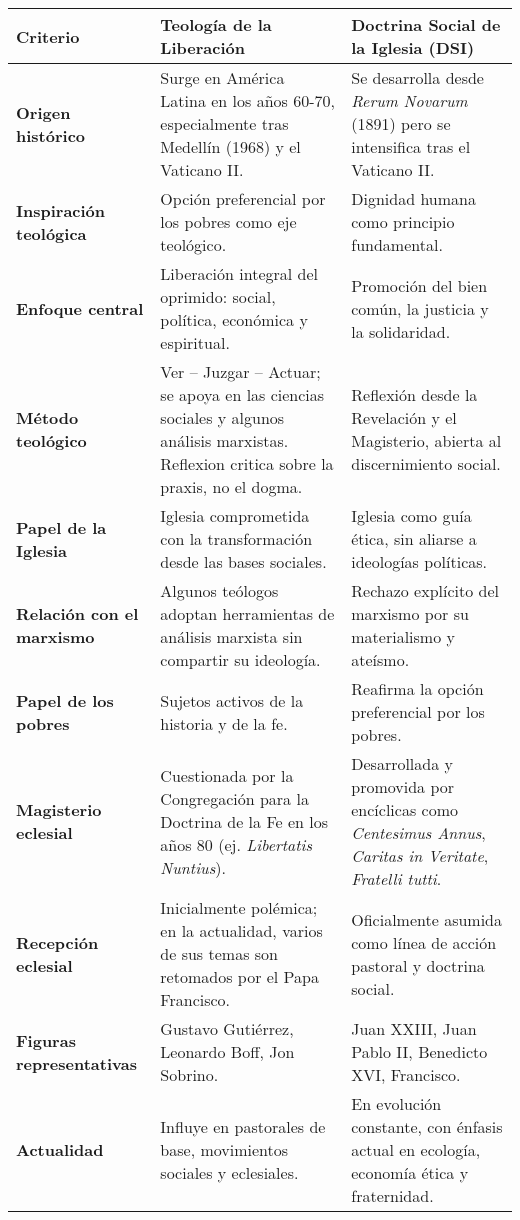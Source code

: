 \documentclass[12pt]{article}
\begin{document}
\renewcommand{\arraystretch}{1.5}
\begin{tabularx}{\textwidth}{|>{\bfseries}m{4cm}|X|X|}
\hline
\textbf{Criterio} & \textbf{Teología de la Liberación} & \textbf{Doctrina Social de la Iglesia (DSI)} \\
\hline
Origen histórico & Surge en América Latina en los años 60-70, especialmente tras Medellín (1968) y el Vaticano II. & Se desarrolla desde \textit{Rerum Novarum} (1891) pero se intensifica tras el Vaticano II. \\
\hline
Inspiración teológica & Opción preferencial por los pobres como eje teológico. & Dignidad humana como principio fundamental. \\
\hline
Enfoque central & Liberación integral del oprimido: social, política, económica y espiritual. & Promoción del bien común, la justicia y la solidaridad. \\
\hline
Método teológico & Ver – Juzgar – Actuar; se apoya en las ciencias sociales y algunos análisis marxistas. Reflexion critica sobre la praxis, no el dogma.& Reflexión desde la Revelación y el Magisterio, abierta al discernimiento social. \\
\hline
Papel de la Iglesia & Iglesia comprometida con la transformación desde las bases sociales. & Iglesia como guía ética, sin aliarse a ideologías políticas. \\
\hline
Relación con el marxismo & Algunos teólogos adoptan herramientas de análisis marxista sin compartir su ideología. & Rechazo explícito del marxismo por su materialismo y ateísmo. \\
\hline
Papel de los pobres & Sujetos activos de la historia y de la fe. & Reafirma la opción preferencial por los pobres. \\
\hline
Magisterio eclesial & Cuestionada por la Congregación para la Doctrina de la Fe en los años 80 (ej. \textit{Libertatis Nuntius}). & Desarrollada y promovida por encíclicas como \textit{Centesimus Annus}, \textit{Caritas in Veritate}, \textit{Fratelli tutti}. \\
\hline
Recepción eclesial & Inicialmente polémica; en la actualidad, varios de sus temas son retomados por el Papa Francisco. & Oficialmente asumida como línea de acción pastoral y doctrina social. \\
\hline
Figuras representativas & Gustavo Gutiérrez, Leonardo Boff, Jon Sobrino. & Juan XXIII, Juan Pablo II, Benedicto XVI, Francisco. \\
\hline
Actualidad & Influye en pastorales de base, movimientos sociales y eclesiales. & En evolución constante, con énfasis actual en ecología, economía ética y fraternidad. \\
\hline
\end{tabularx}
\end{document}
